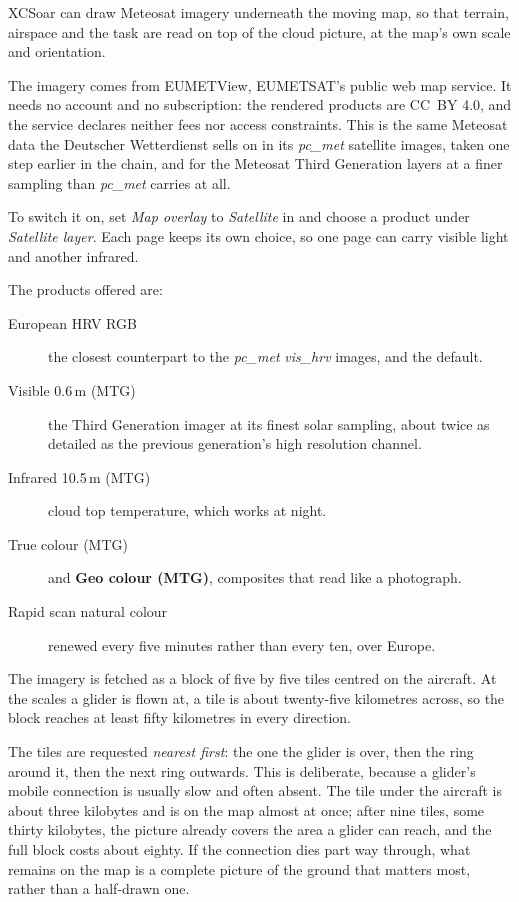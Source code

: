 XCSoar can draw Meteosat imagery underneath the moving map, so that
terrain, airspace and the task are read on top of the cloud picture,
at the map's own scale and orientation.

The imagery comes from EUMETView, EUMETSAT's public web map service.
It needs no account and no subscription: the rendered products are
CC~BY 4.0, and the service declares neither fees nor access
constraints.  This is the same Meteosat data the Deutscher
Wetterdienst sells on in its \emph{pc\_met} satellite images, taken
one step earlier in the chain, and for the Meteosat Third Generation
layers at a finer sampling than \emph{pc\_met} carries at all.

To switch it on, set \emph{Map overlay} to \emph{Satellite} in
 and choose a product under \emph{Satellite
layer}.  Each page keeps its own choice, so one page can carry visible
light and another infrared.

The products offered are:

\begin{description}
\item[European HRV RGB] the closest counterpart to the \emph{pc\_met}
  \emph{vis\_hrv} images, and the default.
\item[Visible 0.6\,\textmu m (MTG)] the Third Generation imager at its
  finest solar sampling, about twice as detailed as the previous
  generation's high resolution channel.
\item[Infrared 10.5\,\textmu m (MTG)] cloud top temperature, which
  works at night.
\item[True colour (MTG)] and \textbf{Geo colour (MTG)}, composites
  that read like a photograph.
\item[Rapid scan natural colour] renewed every five minutes rather
  than every ten, over Europe.
\end{description}

The imagery is fetched as a block of five by five tiles centred on
the aircraft.  At the scales a glider is flown at, a tile is about
twenty-five kilometres across, so the block reaches at least fifty
kilometres in every direction.

The tiles are requested \emph{nearest first}: the one the glider is
over, then the ring around it, then the next ring outwards.  This is
deliberate, because a glider's mobile connection is usually slow and
often absent.  The tile under the aircraft is about three kilobytes
and is on the map almost at once; after nine tiles, some thirty
kilobytes, the picture already covers the area a glider can reach,
and the full block costs about eighty.  If the connection dies part
way through, what remains on the map is a complete picture of the
ground that matters most, rather than a half-drawn one.

